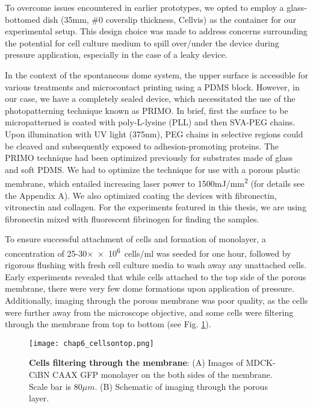 To overcome issues encountered in earlier prototypes, we opted to employ a glass-bottomed dish (35\unit{\mm}, \#0 coverslip thickness, Cellvis) as the container for our experimental setup. This design choice was made to address concerns surrounding the potential for cell culture medium to spill over/under the device during pressure application, especially in the case of a leaky device. 

In the context of the spontaneous dome system, the upper surface is accessible for various treatments and microcontact printing using a PDMS block. However, in our case, we have a completely sealed device, which necessitated the use of the photopatterning technique known as PRIMO. In brief, first the surface to be micropatterned is coated with poly-L-lysine (PLL) and then SVA-PEG chains. Upon illumination with UV light (375\unit{\nm}), PEG chains in selective regions could be cleaved and subsequently exposed to adhesion-promoting proteins. The PRIMO technique had been optimized previously for substrates made of glass and soft PDMS. We had to optimize the technique for use with a porous plastic membrane, which entailed increasing laser power to 1500\unit{mJ/\mm^2} (for details see the Appendix A). We also optimized coating the devices with fibronectin, vitronectin and collagen. For the experiments featured in this thesis, we are using fibronectin mixed with fluorescent fibrinogen for finding the samples.

To ensure successful attachment of cells and formation of monolayer, a concentration of 25-30×\unit{\num{e6} cells/\ml} was seeded for one hour, followed by rigorous flushing with fresh cell culture media to wash away any unattached cells. Early experiments revealed that while cells attached to the top side of the porous membrane, there were very few dome formations upon application of pressure. Additionally, imaging through the porous membrane was poor quality, as the cells were further away from the microscope objective, and some cells were filtering through the membrane from top to bottom (see Fig. \ref{fig_6_4}).  

\begin{figure}[]
	\centering
	\texttt{[image: chap6\_cellsontop.png]}
	\caption{ \textbf{Cells filtering through the membrane}: (A) Images of MDCK-CiBN CAAX GFP monolayer on the both sides of the membrane. Scale bar is $80\mu m$. (B) Schematic of imaging through the porous layer.	}\label{fig_6_4}
\end{figure}


